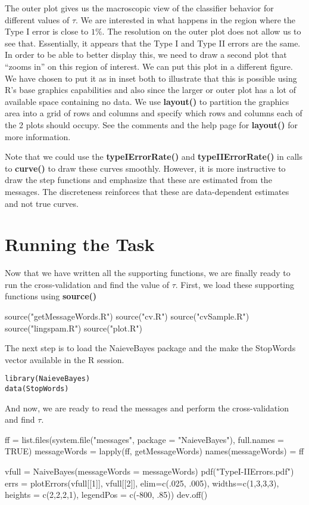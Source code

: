 \documentclass{article}
\def\SFunction#1{\textbf{#1()}}
\begin{document}
The outer plot gives us the macroscopic view of the classifier
behavior for different values of $\tau$.  We are interested in what
happens in the region where the Type I error is close to $1\%$.  The
resolution on the outer plot does not allow us to see that.
Essentially, it appears that the Type I and Type II errors are the
same.  In order to be able to better display this, we need to draw a
second plot that ``zooms in'' on this region of interest. We can put
this plot in a different figure.  We have chosen to put it as in inset
both to illustrate that this is possible using R's base graphics
capabilities and also since the larger or outer plot has a lot of
available space containing no data.  We use \SFunction{layout} to
partition the graphics area into a grid of rows and columns and
specify which rows and columns each of the 2 plots should occupy.  See
the comments and the help page for \SFunction{layout} for more
information.


Note that we could use the \SFunction{typeIErrorRate} and
\SFunction{typeIIErrorRate} in calls to \SFunction{curve} to draw
these curves smoothly.  However, it is more instructive to draw the
step functions and emphasize that these are estimated from the
messages.  The discreteness reinforces that these are data-dependent
estimates and not true curves.




\section{Running the Task}

Now that we have written all the supporting functions,
we are finally ready to run the cross-validation
and find the value of $\tau$.
First, we load these supporting functions
using \SFunction{source}
\begin{listing}[5]{1}
source("getMessageWords.R")
source("cv.R")
source("cvSample.R")
source("lingspam.R")
source("plot.R")
\end{listing}

The next step is to load the NaieveBayes package and the make the
StopWords vector available in the R session.

\begin{verbatim}
library(NaieveBayes)
data(StopWords)
\end{verbatim}

And now, we are ready to read the messages and perform the
cross-validation and find $\tau$.
\begin{listing}[5]{1}
ff = list.files(system.file("messages", package = "NaieveBayes"), full.names = TRUE)
messageWords = lapply(ff, getMessageWords)
names(messageWords) = ff

vfull = NaiveBayes(messageWords = messageWords)
pdf("TypeI-IIErrors.pdf")
errs = plotErrors(vfull[[1]], vfull[[2]], elim=c(.025, .005),
                    widths=c(1,3,3,3), heights = c(2,2,2,1),
                     legendPos = c(-800, .85))
dev.off()
\end{listing}
\end{document}
